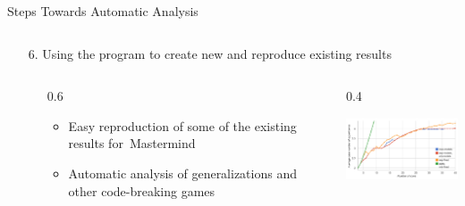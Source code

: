 \documentclass[final]{beamer}
\newcommand{\thando}[4]{
\begin{columns}[T]
\begin{column}{\leftmarginii}
\end{column}
\begin{column}{#3\textwidth}
\vspace{-1.5mm}
\begin{itemize}
#1
\end{itemize}
\end{column}
\begin{column}{#4\textwidth}
#2
\end{column}
\end{columns}\medskip}
\begin{document}
\begin{frame}{}
\begin{block}{Steps Towards Automatic Analysis}
\begin{columns}[T]
\begin{column}{0.48\textwidth}
\begin{enumerate}
{        }{0.95}{0.05}
      \item[6.] Using the program to create new and reproduce existing results
        \thando{
        \item Easy reproduction of some of the existing results for~Mastermind
        \item Automatic analysis of generalizations and \\other code-breaking games
        }{
          \includegraphics[width=4.5cm]{img-results.png}
        }{0.6}{0.4}
        \end{enumerate}
        \vspace{-3ex}~
      \end{column}
      \end{columns}
    \end{block}       
\vfill
\end{frame}
\end{document}
